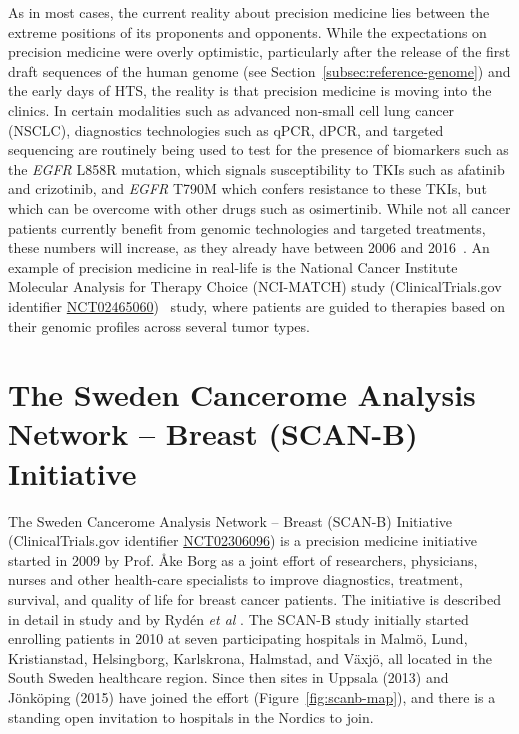 \documentclass[11pt]{book}
\newcommand{\scanb}{\mbox{SCAN-B}}
\begin{document}
As in most cases, the current reality about precision medicine lies between the extreme positions of its proponents and opponents. While the expectations on precision medicine were overly optimistic, particularly after the release of the first draft sequences of the human genome (see Section~\ref{subsec:reference-genome}) and the early days of HTS, the reality is that precision medicine is moving into the clinics. In certain modalities such as advanced non-small cell lung cancer (NSCLC), diagnostics technologies such as qPCR, dPCR, and targeted sequencing are routinely being used to test for the presence of biomarkers such as the \textit{EGFR} L858R mutation, which signals susceptibility to TKIs such as afatinib and crizotinib, and \textit{EGFR} T790M which confers resistance to these TKIs, but which can be overcome with other drugs such as osimertinib. While not all cancer patients currently benefit from genomic technologies and targeted treatments, these numbers will increase, as they already have between 2006 and 2016~\cite{Marquart:2018}. An example of precision medicine in real-life is the National Cancer Institute Molecular Analysis for Therapy Choice (NCI-MATCH) study (ClinicalTrials.gov identifier  \href{https://clinicaltrials.gov/ct2/show/NCT02465060}{NCT02465060})~\cite{Flaherty:2020} study, where patients are guided to therapies based on their genomic profiles across several tumor types.


%
%
\section{The Sweden Cancerome Analysis Network -- Breast (\scanb{}) Initiative}
\label{sec:scanb}

The Sweden Cancerome Analysis Network -- Breast (\scanb{}) Initiative (ClinicalTrials.gov identifier  \href{https://clinicaltrials.gov/ct2/show/NCT02306096}{NCT02306096}) is a precision medicine initiative started in 2009 by Prof. Åke Borg as a joint effort of researchers, physicians, nurses and other health-care specialists to improve diagnostics, treatment, survival, and quality of life for breast cancer patients. The initiative is described in detail in study \I and by Rydén \textit{et al} \cite{Ryden:2018-SCANB}. The \scanb{} study initially started enrolling patients in 2010 at seven participating hospitals in Malmö, Lund, Kristianstad, Helsingborg, Karlskrona, Halmstad, and Växjö, all located in the South Sweden healthcare region. Since then sites in Uppsala (2013) and Jönköping (2015) have joined the effort (Figure~\ref{fig:scanb-map}), and there is a standing open invitation to hospitals in the Nordics to join.
\end{document}
